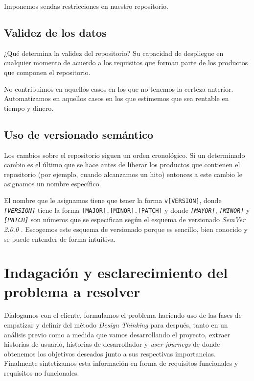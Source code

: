 Imponemos sendas restricciones en nuestro repositorio.

\subsection{Validez de los datos}

¿Qué determina la validez del repositorio? Su capacidad de despliegue en cualquier
momento de acuerdo a los requisitos que forman parte de los productos que componen
el repositorio.

No contribuimos en aquellos casos en los que no tenemos la certeza anterior.
Automatizamos en aquellos casos en los que estimemos que sea rentable en tiempo
y dinero.

\subsection{Uso de versionado semántico}

Los cambios sobre el repositorio siguen un orden cronológico.
Si un determinado cambio es el último que se hace antes de
liberar los productos que contienen el repositorio (por ejemplo,
cuando alcanzamos un hito) entonces a este cambio le asignamos
un nombre específico.

El nombre que le asignamos tiene que tener la forma \texttt{v[VERSION]},
donde \textit{\texttt{[VERSION]}} tiene la forma \texttt{[MAJOR].[MINOR].[PATCH]} y donde
\textit{\texttt{[MAYOR]}}, \textit{\texttt{[MINOR]}} y \textit{\texttt{[PATCH]}} son números que se
especifican según el esquema de versionado \textit{SemVer 2.0.0} \cite{SemVer}.
Escogemos este esquema de versionado porque es sencillo, bien conocido y se puede
entender de forma intuitiva.

\section{Indagación y esclarecimiento del problema a resolver}

Dialogamos con el cliente, formulamos el problema haciendo uso de las fases de
empatizar y definir del método \textit{Design Thinking} para después, tanto en un análisis
previo como a medida que vamos desarrollando el proyecto, extraer historias de usuario, historias de
desarrollador y \textit{user journeys} de donde obtenemos los objetivos deseados
junto a sus respectivas importancias.
Finalmente sintetizamos esta información en forma de requisitos funcionales y
requisitos no funcionales.

